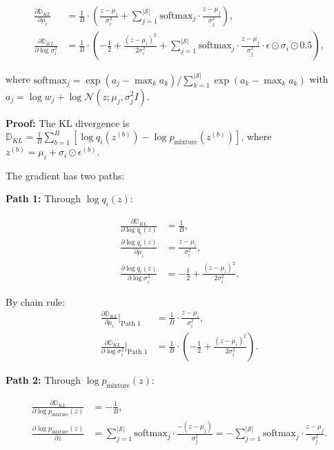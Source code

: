 \begin{align}
\frac{\partial \mathbb{D}_{KL}}{\partial \mu_i} &= \frac{1}{B} \cdot \left( \frac{z - \mu_i}{\sigma_i^2} + \sum_{j=1}^{|\mathcal{S}|} \text{softmax}_j \cdot \frac{z - \mu_j}{\sigma_j^2} \right), \\
\frac{\partial \mathbb{D}_{KL}}{\partial \log\sigma_i^2} &= \frac{1}{B} \cdot \left( -\frac{1}{2} + \frac{(z - \mu_i)^2}{2\sigma_i^2} + \sum_{j=1}^{|\mathcal{S}|} \text{softmax}_j \cdot \frac{z - \mu_j}{\sigma_j^2} \cdot \epsilon \odot \sigma_i \odot 0.5 \right),
\end{align}

where $\text{softmax}_j = \exp(a_j - \max_k a_k) / \sum_{k=1}^{|\mathcal{S}|} \exp(a_k - \max_k a_k)$ with $a_j = \log w_j + \log \mathcal{N}(z; \mu_j, \sigma_j^2 I)$.

\textbf{Proof:} The KL divergence is $\mathbb{D}_{KL} = \frac{1}{B} \sum_{b=1}^{B} [\log q_i(z^{(b)}) - \log p_{\text{mixture}}(z^{(b)})]$, where $z^{(b)} = \mu_i + \sigma_i \odot \epsilon^{(b)}$.

The gradient has two paths:

\textbf{Path 1:} Through $\log q_i(z)$:

\begin{align}
\frac{\partial \mathbb{D}_{KL}}{\partial \log q_i(z)} &= \frac{1}{B}, \\
\frac{\partial \log q_i(z)}{\partial \mu_i} &= \frac{z - \mu_i}{\sigma_i^2}, \\
\frac{\partial \log q_i(z)}{\partial \log\sigma_i^2} &= -\frac{1}{2} + \frac{(z - \mu_i)^2}{2\sigma_i^2}.
\end{align}

By chain rule:
\begin{align}
\frac{\partial \mathbb{D}_{KL}}{\partial \mu_i} \Big|_{\text{Path 1}} &= \frac{1}{B} \cdot \frac{z - \mu_i}{\sigma_i^2}, \\
\frac{\partial \mathbb{D}_{KL}}{\partial \log\sigma_i^2} \Big|_{\text{Path 1}} &= \frac{1}{B} \cdot \left( -\frac{1}{2} + \frac{(z - \mu_i)^2}{2\sigma_i^2} \right).
\end{align}

\textbf{Path 2:} Through $\log p_{\text{mixture}}(z)$:

\begin{align}
\frac{\partial \mathbb{D}_{KL}}{\partial \log p_{\text{mixture}}(z)} &= -\frac{1}{B}, \\
\frac{\partial \log p_{\text{mixture}}(z)}{\partial z} &= \sum_{j=1}^{|\mathcal{S}|} \text{softmax}_j \cdot \frac{-(z - \mu_j)}{\sigma_j^2} = -\sum_{j=1}^{|\mathcal{S}|} \text{softmax}_j \cdot \frac{z - \mu_j}{\sigma_j^2}.
\end{align}


